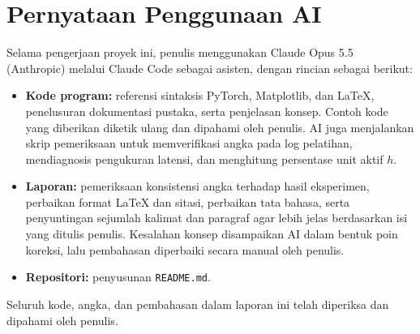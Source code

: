 \documentclass{article}
\begin{document}
\section{Pernyataan Penggunaan AI}
Selama pengerjaan proyek ini, penulis menggunakan Claude Opus 5.5 (Anthropic) melalui Claude Code sebagai asisten, dengan rincian sebagai berikut:
\begin{itemize}
    \item \textbf{Kode program:} referensi sintaksis PyTorch, Matplotlib, dan LaTeX, penelusuran dokumentasi pustaka, serta penjelasan konsep. Contoh kode yang diberikan diketik ulang dan dipahami oleh penulis. AI juga menjalankan skrip pemeriksaan untuk memverifikasi angka pada log pelatihan, mendiagnosis pengukuran latensi, dan menghitung persentase unit aktif $h$.
    \item \textbf{Laporan:} pemeriksaan konsistensi angka terhadap hasil eksperimen, perbaikan format LaTeX dan sitasi, perbaikan tata bahasa, serta penyuntingan sejumlah kalimat dan paragraf agar lebih jelas berdasarkan isi yang ditulis penulis. Kesalahan konsep disampaikan AI dalam bentuk poin koreksi, lalu pembahasan diperbaiki secara manual oleh penulis.
    \item \textbf{Repositori:} penyusunan \texttt{README.md}.
\end{itemize}
Seluruh kode, angka, dan pembahasan dalam laporan ini telah diperiksa dan dipahami oleh penulis.
\end{document}
